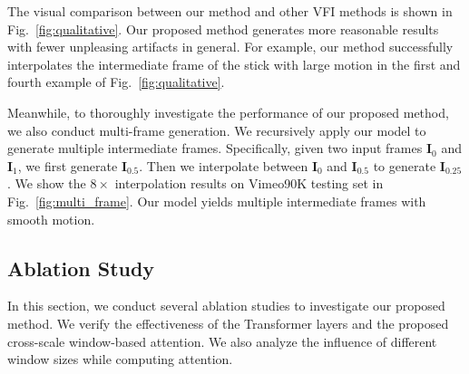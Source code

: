 \documentclass[10pt,twocolumn,letterpaper]{article}
\begin{document}
	The visual comparison between our method and other VFI methods is shown in Fig.~\ref{fig:qualitative}. Our proposed method generates more reasonable results with fewer unpleasing artifacts in general. For example, our method successfully interpolates the intermediate frame of the stick with large motion in the first and fourth example of Fig.~\ref{fig:qualitative}.
	
	Meanwhile, to thoroughly investigate the performance of our proposed method, we also conduct multi-frame generation. We recursively apply our model to generate multiple intermediate frames. Specifically, given two input frames $\bm{I}_0$ and $\bm{I}_1$, we first generate $\bm{I}_{0.5}$. Then we interpolate between $\bm{I}_0$ and $\bm{I}_{0.5}$ to generate $\bm{I}_{0.25}$. We show the $8 \times$ interpolation results on Vimeo90K testing set in Fig.~\ref{fig:multi_frame}. Our model yields multiple intermediate frames with smooth motion.
	
	
	
	


	
	
	
	
	\begin{table}
		\setlength{\belowcaptionskip}{0pt}
		\centering
		\caption{Ablation study on the window sizes of self-attention. }
		\label{table:aba_ws}
		\vspace{-0.10in}
	\end{table}
	
	
	
	
	
	\subsection{Ablation Study}
	
	
	In this section, we conduct several ablation studies to investigate our proposed method. We verify the effectiveness of the Transformer layers and the proposed cross-scale window-based attention. We also analyze the influence of different window sizes while computing attention.
	
\end{document}
